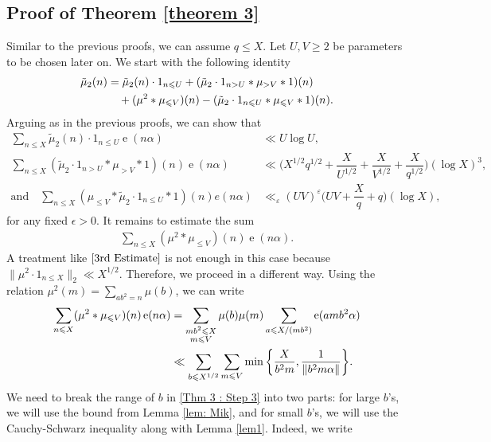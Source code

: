 \documentclass[11pt]{amsart}
\numberwithin{equation}{section}
\numberwithin{figure}{section}
\theoremstyle{definition}
\newcommand{\e}{\operatorname{e}}
\begin{document}
\subsection{Proof of Theorem \ref{theorem 3}}
Similar to the previous proofs, we can assume $q \leqslant X$. Let $U, V \geqslant 2$ be parameters to be chosen later on. We start with the following identity
\begin{align*}
\tilde{\mu}_2(n) &= \tilde{\mu}_2(n)\cdot 1_{n\leqslant U} + (\tilde{\mu}_2\cdot1_{n>U}*\mu_{>V}*1)(n) \notag \\
&\quad + (\mu^2*\mu_{\leqslant V})(n)-(\tilde{\mu}_2 \cdot 1_{n \leqslant U}*\mu_{\leqslant V}*1)(n).
\end{align*}
Arguing as in the previous proofs, we can show that
\begin{align}
\sum_{n\leqslant X }\tilde{\mu}_2(n)\cdot 1_{n \leqslant U} \e(n\alpha) &\ll U \log U, \label{Thm 3 : Step 2A}\\
\sum_{n\leqslant X }(\tilde{\mu}_2\cdot1_{n>U}*\mu_{ >V}*1)(n)\e(n\alpha) &\ll \bigg(X^{1/2}q^{1/2} + \dfrac{X}{U^{1/2}}+\dfrac{X}{V^{1/2}} +\dfrac{X}{q^{1/2}}\bigg) (\log X)^3,\label{Thm 3 : Step 2B} \\
\textrm{and} \quad \sum_{n\leqslant X }(\mu_{ \leqslant V}*\tilde{\mu}_2 \cdot 1_{n \leqslant U}*1)(n) e(n\alpha) &\ll_{\varepsilon} (UV)^{\varepsilon}\bigg( UV+ \dfrac{X}{q} + q\bigg)(\log X), \label{Thm 3 : Step 2C}
\end{align}
for any fixed $\epsilon>0$. It remains to estimate the sum
\begin{align*}
    \sum_{n\leqslant X }(\mu^2*\mu_{\leqslant V})(n)\e(n\alpha).
\end{align*}
A treatment like $\eqref{3rd Estimate}$ is not enough in this case because $\|\mu^2 \cdot 1_{n\leqslant X} \|_2 \ll X^{1/2}$. Therefore, we proceed in a different way. Using the relation $\mu^2(m)=\sum_{ab^2=n}\mu(b)$, we can write
\begin{align}
     \sum_{n\leqslant X }(\mu^2*\mu_{\leqslant V})(n)\e(n\alpha) &=\sum_{\substack{mb^2\leqslant X \\ m\leqslant V}}\mu(b)\mu(m)\sum_{a\leqslant X /(mb^2)}\e(amb^2\alpha) \notag \\
     &\ll \sum_{b\leqslant X ^{1/2}}\sum_{m\leqslant V}\min\bigg\{\dfrac{X}{b^2m}, \dfrac{1}{\|b^2m\alpha\|}\bigg\} \label{Thm 3 : Step 3}.
\end{align}
We need to break the range of $b$ in \eqref{Thm 3 : Step 3} into two parts: for large $b$'s, we will use the bound from Lemma \ref{lem: Mik}, and for small $b$'s, we will use the Cauchy-Schwarz inequality along with Lemma \ref{lem1}. Indeed, we write
\end{document}
